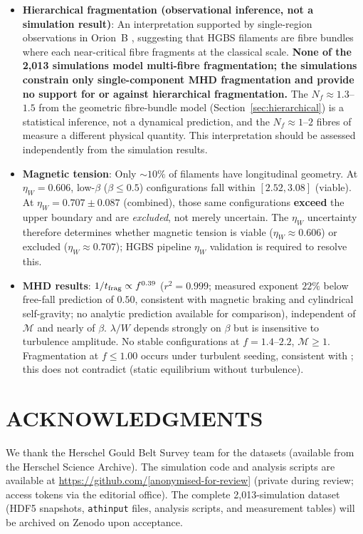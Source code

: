 \documentclass[twoside,twocolumn]{mnras}
\begin{document}
\begin{itemize}
    \item \textbf{Hierarchical fragmentation (observational inference, not a simulation result)}:
    An interpretation supported by single-region observations in Orion~B \citep{Yang2024},
    suggesting that HGBS filaments are fibre bundles where each near-critical fibre fragments
    at the classical scale. \textbf{None of the 2,013 simulations model multi-fibre fragmentation;
    the simulations constrain only single-component MHD fragmentation and provide no
    support for or against hierarchical fragmentation.} The $N_f \approx 1.3$--$1.5$ from the
    geometric fibre-bundle model (Section~\ref{sec:hierarchical}) is a statistical inference,
    not a dynamical prediction, and the $N_f \approx 1$--$2$ fibres of \citet{Hacar2018} measure
    a different physical quantity. This interpretation should be assessed independently
    from the simulation results.

    \item \textbf{Magnetic tension}: Only ${\sim}10\%$ of filaments have longitudinal
    geometry. At $\eta_W = 0.606$, low-$\beta$ ($\beta \leq 0.5$) configurations fall
    within $[2.52, 3.08]$ (viable). At $\eta_W = 0.707 \pm 0.087$ (combined), those same
    configurations \textbf{exceed} the upper boundary and are \textit{excluded}, not merely
    uncertain. The $\eta_W$ uncertainty therefore determines whether magnetic tension is
    viable ($\eta_W \approx 0.606$) or excluded ($\eta_W \approx 0.707$); HGBS pipeline
    $\eta_W$ validation is required to resolve this.

    \item \textbf{MHD results}: $1/t_{\rm frag} \propto f^{0.39}$ ($r^2=0.999$; measured
    exponent $22\%$ below free-fall prediction of $0.50$, consistent with magnetic braking
    and cylindrical self-gravity; no analytic prediction available for comparison), independent
    of $\mathcal{M}$ and nearly of $\beta$. $\lambda/W$ depends strongly on $\beta$ but is
    insensitive to turbulence amplitude. No stable configurations at $f=1.4$--$2.2$,
    $\mathcal{M} \geq 1$. Fragmentation at $f \leq 1.00$ occurs under turbulent seeding,
    consistent with \citet{Padoan2011}; this does not contradict \citet{Ostriker1964}
    (static equilibrium without turbulence).

\end{itemize}

\section*{ACKNOWLEDGMENTS}

We thank the Herschel Gould Belt Survey team for the datasets (available from the
Herschel Science Archive). The simulation code and analysis scripts are available at
\url{https://github.com/[anonymised-for-review]} (private during review; access tokens
via the editorial office). The complete 2,013-simulation dataset (HDF5 snapshots,
\texttt{athinput} files, analysis scripts, and measurement tables) will be archived on
Zenodo upon acceptance.



\end{document}
